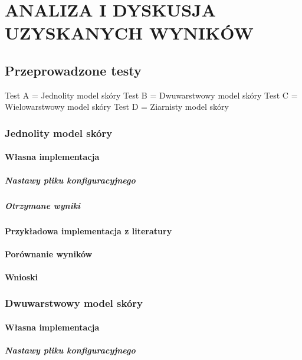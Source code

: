 \chapter{ANALIZA I DYSKUSJA UZYSKANYCH WYNIKÓW}
\label{chpt:analiza-i-dyskusja-uzyskanych-wyników}

\section{Przeprowadzone testy}

Test A = Jednolity model skóry
Test B = Dwuwarstwowy model skóry
Test C = Wielowarstwowy model skóry
Test D = Ziarnisty model skóry

\subsection{Jednolity model skóry}
\subsubsection{Własna implementacja}
\paragraph{Nastawy pliku konfiguracyjnego}
\paragraph{Otrzymane wyniki}
\subsubsection{Przykładowa implementacja z literatury}
\subsubsection{Porównanie wyników}
\subsubsection{Wnioski}

\subsection{Dwuwarstwowy model skóry}
\subsubsection{Własna implementacja}
\paragraph{Nastawy pliku konfiguracyjnego}
